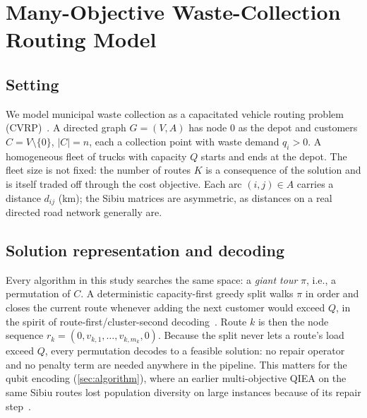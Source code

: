 \section{Many-Objective Waste-Collection Routing Model}
\label{sec:problem}

\subsection{Setting}
We model municipal waste collection as a capacitated vehicle routing problem
(CVRP)~\cite{toth2014vrp,belien2014waste}. A directed graph $G=(V,A)$ has
node $0$ as the depot and customers $C=V\setminus\{0\}$, $|C|=n$, each a
collection point with waste demand $q_i>0$. A homogeneous fleet of trucks with
capacity $Q$ starts and ends at the depot. The fleet size is not fixed: the
number of routes $K$ is a consequence of the solution and is itself traded off
through the cost objective. Each arc $(i,j)\in A$ carries a distance $d_{ij}$
(km); the Sibiu matrices are asymmetric, as distances on a real directed
road network generally are.

\subsection{Solution representation and decoding}
Every algorithm in this study searches the same space: a \emph{giant tour}
$\pi$, i.e., a permutation of $C$. A deterministic capacity-first greedy split
walks $\pi$ in order and closes the current route whenever adding the next
customer would exceed $Q$, in the spirit of route-first/cluster-second
decoding~\cite{prins2004simple}. Route $k$ is then the node sequence
$r_k=(0,v_{k,1},\dots,v_{k,m_k},0)$. Because the split never lets a route's
load exceed $Q$, every permutation decodes to a feasible solution: no repair
operator and no penalty term are needed anywhere in the pipeline. This matters
for the qubit encoding (\cref{sec:algorithm}), where an earlier multi-objective
QIEA on the same Sibiu routes lost population diversity on large instances
because of its repair step~\cite{gilea2026scalable}.

